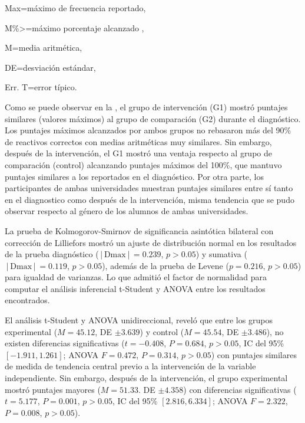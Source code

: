 \documentclass[spanish]{textolivre}
\begin{document}
\begin{table}[h!]
\begin{threeparttable}
\begin{tablenotes}
{\item Max=máximo de frecuencia reportado, 
\item M\%>=máximo porcentaje alcanzado \cite{manikandan2011frequency}, 
\item M=media aritmética, 
\item DE=desviación estándar, 
\item Err. T=error típico.
}
\end{tablenotes}
\end{threeparttable}
\end{table}





Como se puede observar en la , el grupo de intervención (G1) mostró puntajes similares (valores máximos) al grupo de comparación (G2) durante el diagnóstico. Los puntajes máximos alcanzados por ambos grupos no rebasaron más del 90\% de reactivos correctos con medias aritméticas muy similares. Sin embargo, después de la intervención, el G1 mostró una ventaja respecto al grupo de comparación (control) alcanzando puntajes máximos del 100\%, que mantuvo puntajes similares a los reportados en el diagnóstico. Por otra parte, los participantes de ambas universidades muestran puntajes similares entre sí tanto en el diagnostico como después de la intervención, misma tendencia que se pudo observar respecto al género de los alumnos de ambas universidades.

La prueba de Kolmogorov-Smirnov de significancia asintótica bilateral con corrección de Lilliefors mostró un ajuste de distribución normal en los resultados de la prueba diagnóstico ($│\text{Dmax}│=0.239$, $p>0.05$) y sumativa ($│\text{Dmax}│=0.119$, $p>0.05$), además de la prueba de Levene ($p=0.216$, $p>0.05$) para igualdad de varianzas. Lo que admitió el factor de normalidad para computar el análisis inferencial t-Student y ANOVA entre los resultados encontrados.

El análisis t-Student y ANOVA unidireccional, reveló que entre los grupos experimental ($M=45.12$, DE $\pm 3.639$) y control ($M=45.54$, DE $\pm 3.486$), no existen diferencias significativas ($t=-0.408$, $P=0.684$, $p>0.05$, IC del 95\% $[-1.911, 1.261]$; ANOVA $F=0.472$, $P=0.314$, $p>0.05$) con puntajes similares de medida de tendencia central previo a la intervención de la variable independiente. Sin embargo, después de la intervención, el grupo experimental mostró puntajes mayores ($M=51.33$. DE $\pm 4.358$) con diferencias significativas ($t=5.177$, $P=0.001$, $p>0.05$, IC del 95\% $[2.816, 6.334]$; ANOVA $F=2.322$, $P=0.008$, $p>0.05$).
\end{document}
